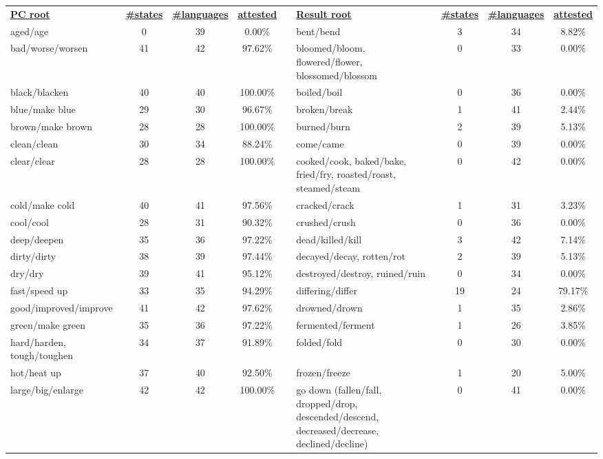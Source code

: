 \begin{tabular}{p{3cm}ccccp{3cm}ccc}
\underline{\textbf{PC root}} & \underline{\textbf{\#states}} & \underline{\textbf{\#languages}} & \underline{\textbf{attested}} & & \underline{\textbf{Result root}} & \underline{\textbf{\#states}} & \underline{\textbf{\#languages}} & \underline{\textbf{attested}} \\
aged/age & 0 & 39 & 0.00\% & & bent/bend & 3 & 34 & 8.82\% \\
bad/worse/worsen & 41 & 42 & 97.62\% & & bloomed/bloom, flowered/flower, blossomed/blossom & 0 & 33 & 0.00\% \\
black/blacken & 40 & 40 & 100.00\% & & boiled/boil & 0 & 36 & 0.00\% \\
blue/make blue & 29 & 30 & 96.67\% & & broken/break & 1 & 41 & 2.44\% \\
brown/make brown & 28 & 28 & 100.00\% & & burned/burn & 2 & 39 & 5.13\% \\
clean/clean & 30 & 34 & 88.24\% & & come/came & 0 & 39 & 0.00\% \\
clear/clear & 28 & 28 & 100.00\% & & cooked/cook, baked/bake, fried/fry, roasted/roast, steamed/steam & 0 & 42 & 0.00\% \\
cold/make cold & 40 & 41 & 97.56\% & & cracked/crack & 1 & 31 & 3.23\% \\
cool/cool & 28 & 31 & 90.32\% & & crushed/crush & 0 & 36 & 0.00\% \\
deep/deepen & 35 & 36 & 97.22\% & & dead/killed/kill & 3 & 42 & 7.14\% \\
dirty/dirty & 38 & 39 & 97.44\% & & decayed/decay, rotten/rot & 2 & 39 & 5.13\% \\
dry/dry & 39 & 41 & 95.12\% & & destroyed/destroy, ruined/ruin & 0 & 34 & 0.00\% \\
fast/speed up & 33 & 35 & 94.29\% & & differing/differ & 19 & 24 & 79.17\% \\
good/improved/improve & 41 & 42 & 97.62\% & & drowned/drown & 1 & 35 & 2.86\% \\
green/make green & 35 & 36 & 97.22\% & & fermented/ferment & 1 & 26 & 3.85\% \\
hard/harden, tough/toughen & 34 & 37 & 91.89\% & & folded/fold & 0 & 30 & 0.00\% \\
hot/heat up & 37 & 40 & 92.50\% & & frozen/freeze & 1 & 20 & 5.00\% \\
large/big/enlarge & 42 & 42 & 100.00\% & & go down (fallen/fall, dropped/drop, descended/descend, decreased/decrease, declined/decline) & 0 & 41 & 0.00\% \\

\end{tabular}

